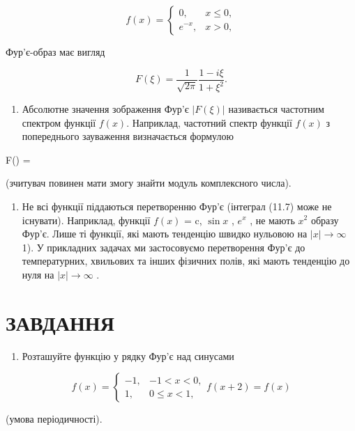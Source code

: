 \documentclass[
  ukrainian,
]{article}
\providecommand{\tightlist}{%
  \setlength{\itemsep}{0pt}\setlength{\parskip}{0pt}}
\begin{document}
\[
f(x) =
\begin{cases} 0, & x \le 0, \\ e^{-x}, & x > 0, \end{cases}
\]

Фур'є-образ має вигляд

\[
F(\xi) = \frac{1}{\sqrt{2\pi}} \frac{1 - i\xi}{1 + \xi^2}.
\]

\begin{enumerate}
\def\labelenumi{\arabic{enumi}.}
\setcounter{enumi}{1}
\tightlist
\item
  Абсолютне значення зображення Фур'є \(|F(\xi)|\) називається частотним
  спектром функції \(f(x)\). Наприклад, частотний спектр функції
  \(f(x)\) з попереднього зауваження визначається формулою
\end{enumerate}

\textbar F(\xi)\textbar{} = 

(зчитувач повинен мати змогу знайти модуль комплексного числа).

\begin{enumerate}
\def\labelenumi{\arabic{enumi}.}
\setcounter{enumi}{2}
\tightlist
\item
  Не всі функції піддаються перетворенню Фур'є (інтеграл (11.7) може не
  існувати). Наприклад, функції \(f(x)\) = c, \(\sin x\) , \(e^x\) , не
  мають \(x^2\) образу Фур'є. Лише ті функції, які мають тенденцію
  швидко нульовою на \(|x| \to \infty\) 1). У прикладних задачах ми
  застосовуємо перетворення Фур'є до температурних, хвильових та інших
  фізичних полів, які мають тенденцію до нуля на \(|x| \to \infty\) .
\end{enumerate}

\section{ЗАВДАННЯ}\label{ux437ux430ux432ux434ux430ux43dux43dux44f-8}

\begin{enumerate}
\def\labelenumi{\arabic{enumi}.}
\tightlist
\item
  Розташуйте функцію у рядку Фур'є над синусами
\end{enumerate}

\[
f(x) =
\begin{cases} -1, & -1 < x < 0, \\ 1, & 0 \le x < 1, \end{cases}
f(x+2) = f(x)
\]

(умова періодичності).
\end{document}
